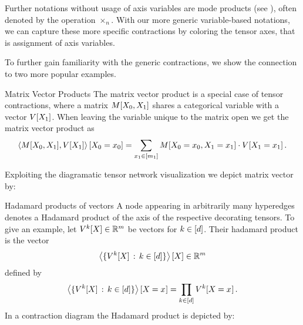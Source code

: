 Further notations without usage of axis variables are mode products (see \cite{kolda_tensor_2009,hackbusch_tensor_2012,cichocki_tensor_2015}), often denoted by the operation $\times_n$.
With our more generic variable-based notations, we can capture these more specific contractions by coloring the tensor axes, that is assignment of axis variables.

To further gain familiarity with the generic contractions, we show the connection to two more popular examples.

\begin{example}{Matrix Vector Products}\label{exa:matrixProduct}
	The matrix vector product is a special case of tensor contractions, where a matrix $M[X_{0},X_{1}]$ shares a categorical variable with a vector $V[X_{1}]$.
	When leaving the variable unique to the matrix open we get the matrix vector product as
		\[ \left\langle M[X_{0},X_{1}],V[X_{1}]\right\rangle \left[ X_{0}=x_{0} \right] = \sum_{x_{1}\in[m_{1}]} M[X_{0}=x_{0},X_{1}=x_{1}] \cdot V[X_{1}=x_{1}] \, .  \]

	Exploiting the diagramatic tensor network visualization we depict matrix vector by: %
	\begin{center}
		
	\end{center}
\end{example}

\begin{example}{Hadamard products of vectors}\label{exa:hadamard}
	A node appearing in arbitrarily many hyperedges denotes a Hadamard product of the axis of the respective decorating tensors.
	To give an example, let $V^{k}[X]\in\mathbb{R}^m$ be vectors for $k\in[d]$. Their hadamard product is the vector
		\[ \left\langle \{V^{k}[X] \,:\, k\in[d]\}\right\rangle \left[ X \right]  \in \mathbb{R}^m \]
	defined by
		\[ \left\langle \{V^{k}[X] \,:\, k\in[d]\}\right\rangle \left[ X_{}=x_{} \right]
		= \prod_{k\in[d]} V^{k}[X_{}=x_{}]\, . \]
	In a contraction diagram the Hadamard product is depicted by: %
	\begin{center}
		
	\end{center}
\end{example}



